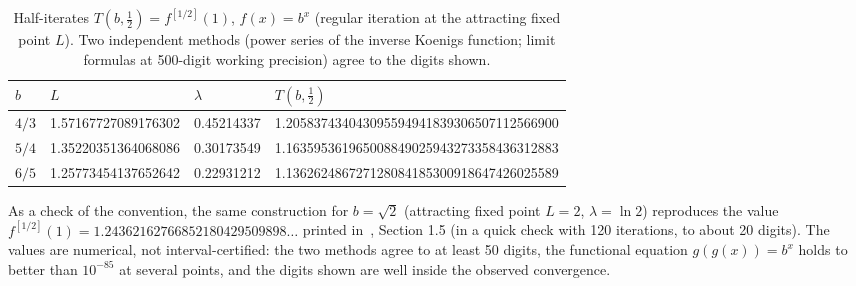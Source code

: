 \begin{table}[h]
\centering
\caption{Half-iterates $T(b,\tfrac12)=f^{[1/2]}(1)$, $f(x)=b^x$ (regular iteration at the attracting fixed point $L$). Two independent methods (power series of the inverse Koenigs function; limit formulas at 500-digit working precision) agree to the digits shown.}\label{tab:tet}
\begin{tabular}{llll}
\toprule
$b$ & $L$ & $\lambda$ & $T(b,\tfrac12)$\\
\midrule
$4/3$ & 1.57167727089176302 & 0.45214337 & 1.205837434043095594941839306507112566900\\
$5/4$ & 1.35220351364068086 & 0.30173549 & 1.163595361965008849025943273358436312883\\
$6/5$ & 1.25773454137652642 & 0.22931212 & 1.136262486727128084185300918647426025589\\
\bottomrule
\end{tabular}
\end{table}

As a check of the convention, the same construction for $b=\sqrt2$ (attracting fixed point $L=2$, $\lambda=\ln2$) reproduces the value $f^{[1/2]}(1)=1.24362162766852180429509898\ldots$ printed in~\cite{FinchIV}, Section 1.5 (in a quick check with 120 iterations, to about 20 digits). The values are numerical, not interval-certified: the two methods agree to at least 50 digits, the functional equation $g(g(x))=b^x$ holds to better than $10^{-85}$ at several points, and the digits shown are well inside the observed convergence.
